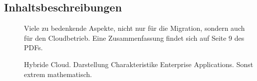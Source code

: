 \subsection{Inhaltsbeschreibungen}
\begin{description}

\item[] Viele
zu bedenkende Aspekte, nicht nur für die Migration, sondern auch für den
Cloudbetrieb. Eine Zusammenfassung findet sich auf Seite 9 des PDFs.
\item[] Hybride
Cloud. Darstellung Charakteristike Enterprise Applications. Sonst extrem
mathematisch.
\end{description}
